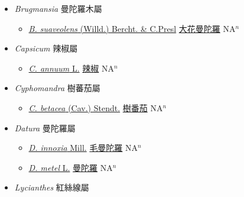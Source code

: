
  \begin{itemize}
 \item[] \textit{Brugmansia} 曼陀羅木屬
                    
  \begin{itemize}
        \item[] \href{http://www.theplantlist.org/tpl1.1/search?q=Brugmansia+suaveolens}{\textit{B. suaveolens} (Willd.) Bercht. \& C.Presl}   \href{\detokenize{http://taibnet.sinica.edu.tw/chi/taibnet_species_list.php?T2=大花曼陀羅&T2_new_value=true&fr=y}}{大花曼陀羅} NA$^n$
  \end{itemize}
 \item[] \textit{Capsicum} 辣椒屬
                    
  \begin{itemize}
        \item[] \href{http://www.theplantlist.org/tpl1.1/search?q=Capsicum+annuum}{\textit{C. annuum} L.}   \href{\detokenize{http://taibnet.sinica.edu.tw/chi/taibnet_species_list.php?T2=辣椒&T2_new_value=true&fr=y}}{辣椒} NA$^n$
  \end{itemize}
 \item[] \textit{Cyphomandra} 樹蕃茄屬
                    
  \begin{itemize}
        \item[] \href{http://www.theplantlist.org/tpl1.1/search?q=Cyphomandra+betacea}{\textit{C. betacea} (Cav.) Stendt.}   \href{\detokenize{http://taibnet.sinica.edu.tw/chi/taibnet_species_list.php?T2=樹番茄&T2_new_value=true&fr=y}}{樹番茄} NA$^n$
  \end{itemize}
 \item[] \textit{Datura} 曼陀羅屬
                    
  \begin{itemize}
        \item[] \href{http://www.theplantlist.org/tpl1.1/search?q=Datura+innoxia}{\textit{D. innoxia} Mill.}     \href{\detokenize{http://taibnet.sinica.edu.tw/chi/taibnet_species_list.php?T2=毛曼陀羅&T2_new_value=true&fr=y}}{毛曼陀羅} NA$^n$
        \item[] \href{http://www.theplantlist.org/tpl1.1/search?q=Datura+metel}{\textit{D. metel} L.}   \href{\detokenize{http://taibnet.sinica.edu.tw/chi/taibnet_species_list.php?T2=曼陀羅&T2_new_value=true&fr=y}}{曼陀羅} NA$^n$
  \end{itemize}
 \item[] \textit{Lycianthes} 紅絲線屬
                    

\end{itemize}
